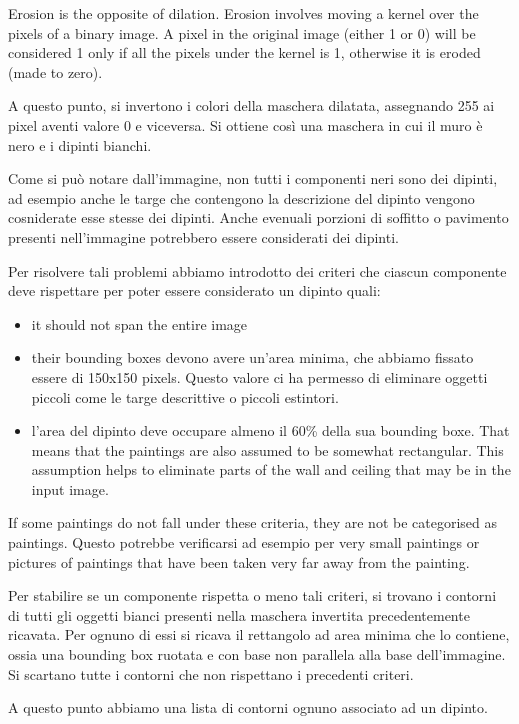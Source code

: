 \documentclass[10pt,twocolumn,letterpaper]{article}
\begin{document}
Erosion is the opposite of dilation. Erosion involves moving a kernel over the pixels of a binary image. A pixel in the original image (either 1 or 0) will be considered 1 only if all the pixels under the kernel is 1, otherwise it is eroded (made to zero).

A questo punto, si invertono i colori della maschera dilatata, assegnando 255 ai pixel aventi valore 0 e viceversa. Si ottiene così una maschera in cui il muro è nero e i dipinti bianchi. 

Come si può notare dall'immagine, non tutti i componenti neri sono dei dipinti, ad esempio anche le targe che contengono la descrizione del dipinto vengono cosniderate esse stesse dei dipinti. Anche evenuali porzioni di soffitto o pavimento presenti nell'immagine potrebbero essere considerati dei dipinti. 

Per risolvere tali problemi abbiamo introdotto dei criteri che ciascun componente deve rispettare per poter essere considerato un dipinto quali:
\begin{itemize}
   \item it should not span the entire image
   \item their bounding boxes devono avere un'area minima, che abbiamo fissato essere di 150x150 pixels. Questo valore ci ha permesso di eliminare oggetti piccoli come le targe descrittive o piccoli estintori.
   \item l'area del dipinto deve occupare almeno il 60\% della sua bounding boxe. That means that the paintings are also assumed to be somewhat rectangular. This assumption helps to eliminate parts of the wall and ceiling that may be in the input image.
\end{itemize}

If some paintings do not fall under these criteria, they are not be categorised as paintings. Questo potrebbe verificarsi ad esempio per very small paintings or pictures of paintings that have been taken very far away from the painting.

Per stabilire se un componente rispetta o meno tali criteri, si trovano i contorni di tutti gli oggetti bianci presenti nella maschera invertita precedentemente ricavata. Per ognuno di essi si ricava il rettangolo ad area minima che lo contiene, ossia una bounding box ruotata e con base non parallela alla base dell'immagine. Si scartano tutte i contorni che non rispettano i precedenti criteri.

A questo punto abbiamo una lista di contorni ognuno associato ad un dipinto.
\end{document}
